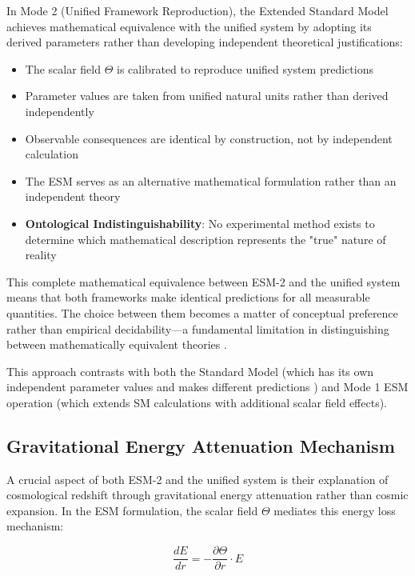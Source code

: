 \documentclass[12pt,a4paper]{article}
\begin{document}
	In Mode 2 (Unified Framework Reproduction), the Extended Standard Model achieves mathematical equivalence with the unified system by adopting its derived parameters rather than developing independent theoretical justifications:
	
	\begin{itemize}
		\item The scalar field $\Theta$ is calibrated to reproduce unified system predictions
		\item Parameter values are taken from unified natural units rather than derived independently
		\item Observable consequences are identical by construction, not by independent calculation
		\item The ESM serves as an alternative mathematical formulation rather than an independent theory
		\item \textbf{Ontological Indistinguishability}: No experimental method exists to determine which mathematical description represents the "true" nature of reality \cite{Duhem1906,Poincare1905}
	\end{itemize}
	
	This complete mathematical equivalence between ESM-2 and the unified system means that both frameworks make identical predictions for all measurable quantities. The choice between them becomes a matter of conceptual preference rather than empirical decidability—a fundamental limitation in distinguishing between mathematically equivalent theories \cite{vanFraassen1980}.
	
	This approach contrasts with both the Standard Model (which has its own independent parameter values and makes different predictions \cite{Weinberg1989}) and Mode 1 ESM operation (which extends SM calculations with additional scalar field effects).
	
	\subsection{Gravitational Energy Attenuation Mechanism}
	\label{subsec:gravitational_energy_attenuation}
	
	A crucial aspect of both ESM-2 and the unified system is their explanation of cosmological redshift through gravitational energy attenuation rather than cosmic expansion. In the ESM formulation, the scalar field $\Theta$ mediates this energy loss mechanism:
	
	\begin{equation}
		\frac{dE}{dr} = -\frac{\partial \Theta}{\partial r} \cdot E
	\end{equation}
	
\end{document}
